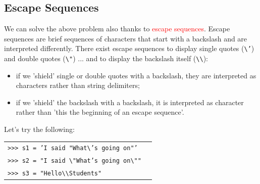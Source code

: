 \documentclass[t,handout,9pt]{beamer}
\begin{document}
\subsection{Escape Sequences}
\begin{frame}
\vfill
We can solve the above problem also thanks to \textcolor{red}{escape sequences}.
\vfill
Escape sequences are brief sequences of characters that start with a backslash and are interpreted differently.
\vfill
There exist escape sequences to display single quotes (\texttt{\textbackslash'}) and double quotes (\texttt{\textbackslash"}) ... and to display the backslash itself (\texttt{\textbackslash\textbackslash}):
\begin{itemize}
	\item if we 'shield' single or double quotes with a backslash, they are interpreted as characters rather than string delimiters;
	\item if we 'shield' the backslash with a backslash, it is interpreted as character rather than 'this the beginning of an escape sequence'.
\end{itemize}
\vfill
Let's try the following:
\begin{table}[]
\begin{tabular}{ll}
\texttt{>{}>{}> s1 = 'I said "What\textbackslash's going on"'} & \\
\texttt{>{}>{}> s2 = "I said \textbackslash"What's going on\textbackslash""} & \\
\texttt{>{}>{}> s3 = "Hello\textbackslash\textbackslash Students"} & \\
\end{tabular}
\end{table}
\vfill
\end{frame}
%
\end{document}
